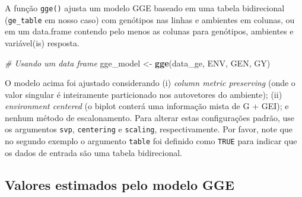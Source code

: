 \documentclass[
]{book}
\makeatletter
\newenvironment{Shaded}{\begin{snugshade}}{\end{snugshade}}
\newcommand{\CommentTok}[1]{\textcolor[rgb]{0.56,0.35,0.01}{\textit{#1}}}
\newcommand{\KeywordTok}[1]{\textcolor[rgb]{0.13,0.29,0.53}{\textbf{#1}}}
\newcommand{\NormalTok}[1]{#1}
\newcommand{\StringTok}[1]{\textcolor[rgb]{0.31,0.60,0.02}{#1}}
\numberwithin{equation}{section}
\newcommand{\indf}[1]{\index[function]{#1@\texttt{#1()}|ST}}
\makeatother
\begin{document}
A função \texttt{gge()} ajusta um modelo GGE baseado em uma tabela bidirecional (\texttt{ge\_table} em nosso caso) com genótipos nas linhas e ambientes em colunas, ou em um data.frame contendo pelo menos as colunas para genótipos, ambientes e variável(is) resposta.
\indf{gge}

\begin{Shaded}
\begin{Highlighting}[]
\CommentTok{\# Usando um data frame}
\NormalTok{gge\_model \textless{}{-}}\StringTok{ }\KeywordTok{gge}\NormalTok{(data\_ge, ENV, GEN, GY)}
\end{Highlighting}
\end{Shaded}

O modelo acima foi ajustado considerando (i) \emph{column metric preserving} (onde o valor singular é inteiramente particionado nos autovetores do ambiente); (ii) \emph{environment centered} (o biplot conterá uma informação mista de G + GEI); e nenhum método de escalonamento. Para alterar estas configurações padrão, use os argumentos \texttt{svp}, \texttt{centering} e \texttt{scaling}, respectivamente. Por favor, note que no segundo exemplo o argumento \texttt{table} foi definido como \texttt{TRUE} para indicar que os dados de entrada são uma tabela bidirecional.

\hypertarget{valores-estimados-pelo-modelo-gge}{%
\subsection{Valores estimados pelo modelo GGE}\label{valores-estimados-pelo-modelo-gge}}
\end{document}
